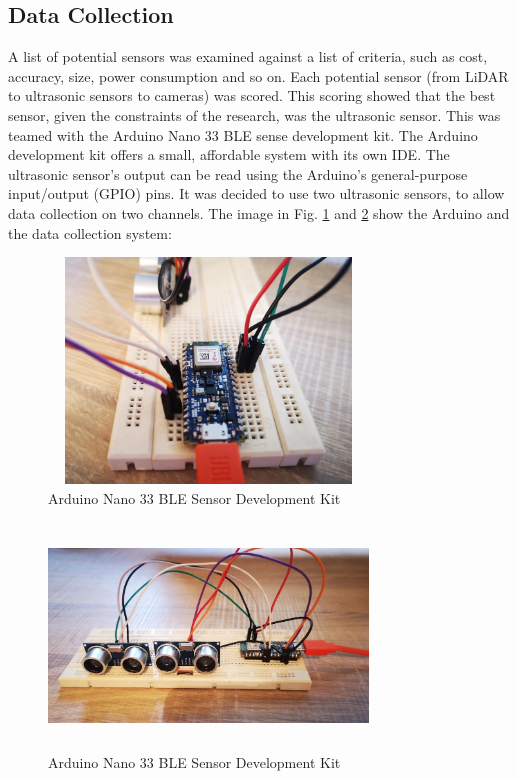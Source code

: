 \documentclass[conference]{IEEEtran}
\begin{document}
\subsection{Data Collection}
A list of potential sensors was examined against a list of criteria, such as cost, accuracy, size, power consumption and so on. Each potential sensor (from LiDAR to ultrasonic sensors to cameras) was scored. This scoring showed that the best sensor, given the constraints of the research, was the ultrasonic sensor. This was teamed with the Arduino Nano 33 BLE sense development kit. The Arduino development kit offers a small, affordable system with its own IDE. The ultrasonic sensor's output can be read using the Arduino's general-purpose input/output (GPIO) pins. It was decided to use two ultrasonic sensors, to allow data collection on two channels. The image in Fig. \ref{fig:collection1} and \ref{fig:collection2} show the Arduino and the data collection system:    
\begin{figure}[ht]
\includegraphics[width=8.5cm, height=6cm]{images/data_collection_system1.png}
\centering
\caption{Arduino Nano 33 BLE Sensor Development Kit}
\label{fig:collection1}
\end{figure}


\begin{figure}[ht]
\includegraphics[width=8.5cm, height=6cm]{images/data_collection_system.png}
\centering
\caption{Arduino Nano 33 BLE Sensor Development Kit}
\label{fig:collection2}
\end{figure}
\end{document}
